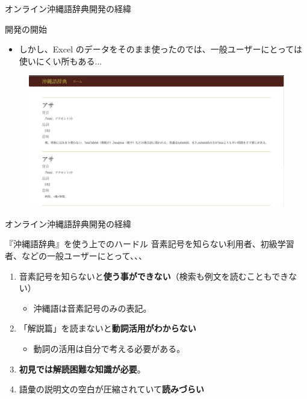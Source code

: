 \documentclass[14pt]{beamer}
\begin{document}
\begin{frame}{オンライン沖縄語辞典開発の経緯}
  \begin{block}{開発の開始}
    \begin{itemize}
    \item しかし、Excel のデータをそのまま使ったのでは、一般ユーザーにとっては使いにくい所もある...
    \end{itemize}
  \end{block}
  \begin{figure}[ht]
    \centering
    \includegraphics[height=0.36\paperheight]{okinawago-app-early-page.jpeg}
  \end{figure}
\end{frame}

\begin{frame}{オンライン沖縄語辞典開発の経緯}
  \begin{block}{『沖縄語辞典』を使う上でのハードル}
    \vspace{0pt}
    音素記号を知らない利用者、初級学習者、などの一般ユーザーにとって、、、
    \begin{enumerate}
    \item 音素記号を知らないと\textbf{使う事ができない}（検索も例文を読むこともできない）
      \begin{itemize}
      \item 沖縄語は音素記号のみの表記。
      \end{itemize}
    \item 「解説篇」を読まないと\textbf{動詞活用がわからない}
      \begin{itemize}
      \item 動詞の活用は自分で考える必要がある。
      \end{itemize}
    \item \textbf{初見では解読困難な知識が必要}。
    \item 語彙の説明文の空白が圧縮されていて\textbf{読みづらい}
    \end{enumerate}
  \end{block}
\end{frame}
\end{document}
